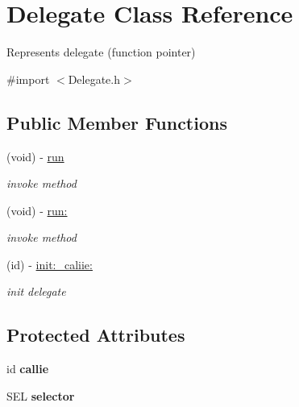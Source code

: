 \hypertarget{interface_delegate}{
\section{\-Delegate \-Class \-Reference}
\label{interface_delegate}
}


\-Represents delegate (function pointer)  




{\ttfamily \#import $<$\-Delegate.\-h$>$}

\subsection*{\-Public \-Member \-Functions}
\begin{DoxyCompactItemize}
\item 
\hypertarget{interface_delegate_a875487d69afa8d804660c7f0ed734ee7}{
(void) -\/ \hyperlink{interface_delegate_a875487d69afa8d804660c7f0ed734ee7}{run}}
\label{interface_delegate_a875487d69afa8d804660c7f0ed734ee7}

\begin{DoxyCompactList}\small\item\em invoke method \end{DoxyCompactList}\item 
(void) -\/ \hyperlink{interface_delegate_a1f3c02fb5f57046f3f4442b1096eae5e}{run\-:}
\begin{DoxyCompactList}\small\item\em invoke method \end{DoxyCompactList}\item 
(id) -\/ \hyperlink{interface_delegate_aaa9688f9ca6576aaa85c273c96c1a914}{init\-:\-\_\-caliie\-:}
\begin{DoxyCompactList}\small\item\em init delegate \end{DoxyCompactList}\end{DoxyCompactItemize}
\subsection*{\-Protected \-Attributes}
\begin{DoxyCompactItemize}
\item 
\hypertarget{interface_delegate_a6523892fcd129c5c6596c71997f2efe8}{
id {\bfseries callie}}
\label{interface_delegate_a6523892fcd129c5c6596c71997f2efe8}

\item 
\hypertarget{interface_delegate_a6c2352c42ea207c8144563e0c506a5c6}{
\-S\-E\-L {\bfseries selector}}
\label{interface_delegate_a6c2352c42ea207c8144563e0c506a5c6}

\end{DoxyCompactItemize}


